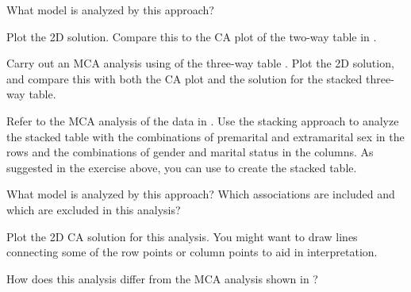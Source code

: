 \documentclass[10pt]{report}\usepackage[]{graphicx}\usepackage[]{color}
\begin{document}
\begin{Exercises}
\begin{enumerate*}
    \item What \loglin model is analyzed by this approach?
    \begin{ans}
    \end{ans}
    
    \item Plot the 2D solution.  Compare this to the CA plot of the two-way table in .
    \begin{ans}
    \end{ans}
    
    \item Carry out an MCA analysis using  of the three-way table .  Plot the 2D solution,
    and compare this with both the CA plot and the solution for the stacked three-way table.
    \begin{ans}
    \end{ans}
      
  \end{enumerate*}

 \exercise\label{lab:presex} Refer to the MCA analysis of the  data in .
   	  Use the stacking approach to analyze the stacked table with the combinations of 
  	  premarital and extramarital sex in the rows and the combinations of gender and marital status
  	  in the columns.  As suggested in the exercise above, you can use 
  	   to create the stacked table.
  	  

  \begin{enumerate*}
  	  \item What \loglin model is analyzed by this approach? Which associations are included and
  	  which are excluded in this analysis?
  	  \begin{ans}
  	  \end{ans}
  	  
  	  \item Plot the 2D CA solution for this analysis.  You might want to draw lines connecting
  	  some of the row points or column points to aid in interpretation.
  	  \begin{ans}
  	  \end{ans}
  	  
  	  \item How does this analysis differ from the MCA analysis shown in ?
  	  \begin{ans}
  	  \end{ans}
  	   
  \end{enumerate*}


\end{Exercises}
\end{document}
